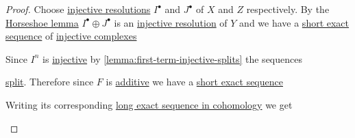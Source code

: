 \documentclass[../../main]{subfiles}
\begin{document}
\begin{proof}
  Choose \hyperref[def:resolution]{injective resolutions} \(I^{\bullet}\) and \(J^{\bullet}\) of \(X\) and \(Z\) respectively.
  By the \hyperref[thm:horseshoe]{Horseshoe lemma} \(I^{\bullet} \oplus J^{\bullet}\) is an \hyperref[def:resolution]{injective resolution} of \(Y\) and we have a \hyperref[def:exact-sequence]{short exact sequence} of \hyperref[def:injective-projective-object]{injective complexes}
  \begin{center}
  \end{center}
  Since \(I^{n}\) is \hyperref[def:injective-projective-object]{injective} by \autoref{lemma:first-term-injective-splits} the sequences
  \begin{center}
  \end{center}
  \hyperref[prop:split-exact-sequence]{split}.
  Therefore since \(F\) is \hyperref[def:additive-functor]{additive} we have a \hyperref[def:exact-sequence]{short exact sequence}
  \begin{center}
  \end{center}
  Writing its corresponding \hyperref[thm:LES-in-cohomology]{long exact sequence in cohomology} we get
  \begin{center}
  \end{center} \qedhere
\end{proof}
\end{document}

